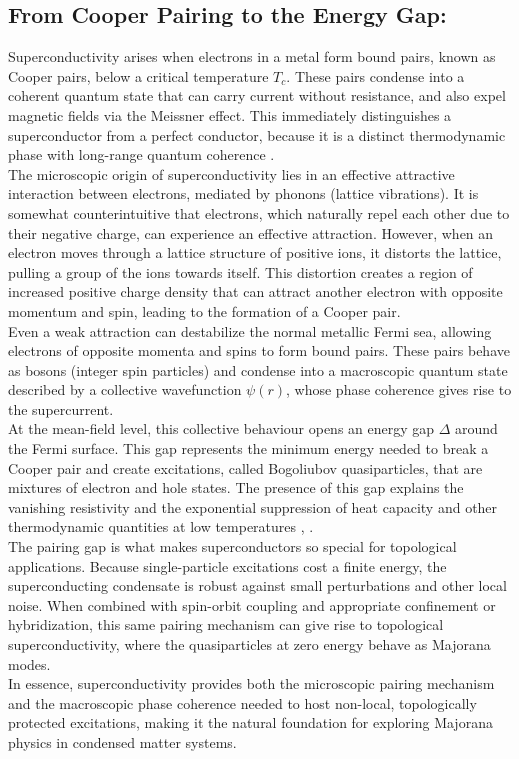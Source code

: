 \documentclass[11pt, letterpaper, titlepage]{article}
\begin{document}
\subsection{From Cooper Pairing to the Energy Gap:} 
Superconductivity arises when electrons in a metal form bound pairs, known as Cooper pairs, below a critical temperature $T_c$. These pairs condense into a coherent quantum state that can carry current without resistance, and also expel magnetic fields via the Meissner effect. This immediately distinguishes a superconductor from a perfect conductor, because it is a distinct thermodynamic phase with long-range quantum coherence  \cite{Cambridge_MBPhysics}.\\
The microscopic origin of superconductivity lies in an effective attractive interaction between electrons, mediated by phonons (lattice vibrations). It is somewhat counterintuitive that electrons, which naturally repel each other due to their negative charge, can experience an effective attraction. However, when an electron moves through a lattice structure of positive ions, it distorts the lattice, pulling a group of the ions towards itself. This distortion creates a region of increased positive charge density that can attract another electron with opposite momentum and spin, leading to the formation of a Cooper pair\cite{Physics_libretexts_2025}.\\
Even a weak attraction can destabilize the normal metallic Fermi sea, allowing electrons of opposite momenta and spins to form bound pairs. These pairs behave as bosons (integer spin particles) and condense into a macroscopic quantum state described by a collective wavefunction $ψ(r)$, whose phase coherence gives rise to the supercurrent.\\ 
At the mean-field level, this collective behaviour opens an energy gap $Δ$ around the Fermi surface. This gap represents the minimum energy needed to break a Cooper pair and create excitations, called Bogoliubov quasiparticles, that are mixtures of electron and hole states. The presence of this gap explains the vanishing resistivity and the exponential suppression of heat capacity and other thermodynamic quantities at low temperatures \cite{Cambridge_MBPhysics}, \cite{BCS}.\\
The pairing gap is what makes superconductors so special for topological applications. Because single-particle excitations cost a finite energy, the superconducting condensate is robust against small perturbations and other local noise. When combined with spin-orbit coupling and appropriate confinement or hybridization, this same pairing mechanism can give rise to topological superconductivity, where the quasiparticles at zero energy behave as Majorana modes.\\
In essence, superconductivity provides both the microscopic pairing mechanism and the macroscopic phase coherence needed to host non-local, topologically protected excitations, making it the natural foundation for exploring Majorana physics in condensed matter systems.
\end{document}
